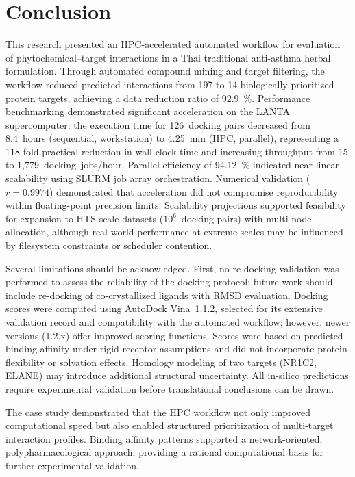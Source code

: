 \documentclass[11pt,a4paper]{article}
\begin{document}
\section{Conclusion}

This research presented an HPC-accelerated automated workflow for evaluation of phytochemical--target interactions in a Thai traditional anti-asthma herbal formulation. Through automated compound mining and target filtering, the workflow reduced predicted interactions from 197 to 14 biologically prioritized protein targets, achieving a data reduction ratio of \SI{92.9}{\percent}. Performance benchmarking demonstrated significant acceleration on the LANTA supercomputer: the execution time for 126~docking pairs decreased from \SI{8.4}{hours} (sequential, workstation) to \SI{4.25}{min} (HPC, parallel), representing a 118-fold practical reduction in wall-clock time and increasing throughput from 15 to 1,779~docking~jobs/hour. Parallel efficiency of \SI{94.12}{\percent} indicated near-linear scalability using SLURM job array orchestration. Numerical validation ($r = 0.9974$) demonstrated that acceleration did not compromise reproducibility within floating-point precision limits. Scalability projections supported feasibility for expansion to HTS-scale datasets ($10^6$~docking pairs) with multi-node allocation, although real-world performance at extreme scales may be influenced by filesystem constraints or scheduler contention.

Several limitations should be acknowledged. First, no re-docking validation was performed to assess the reliability of the docking protocol; future work should include re-docking of co-crystallized ligands with RMSD evaluation. Docking scores were computed using AutoDock Vina~1.1.2, selected for its extensive validation record and compatibility with the automated workflow; however, newer versions (1.2.x) offer improved scoring functions. Scores were based on predicted binding affinity under rigid receptor assumptions and did not incorporate protein flexibility or solvation effects. Homology modeling of two targets (NR1C2, ELANE) may introduce additional structural uncertainty. All in-silico predictions require experimental validation before translational conclusions can be drawn.

The case study demonstrated that the HPC workflow not only improved computational speed but also enabled structured prioritization of multi-target interaction profiles. Binding affinity patterns supported a network-oriented, polypharmacological approach, providing a rational computational basis for further experimental validation.
\end{document}
